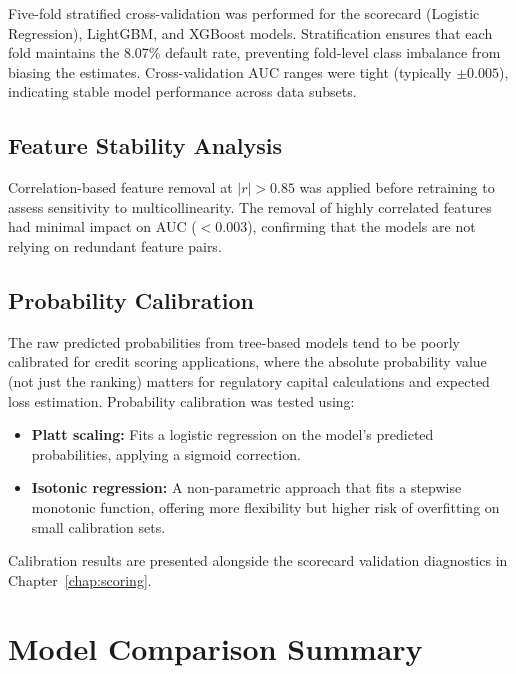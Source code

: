 Five-fold stratified cross-validation was performed for the scorecard (Logistic Regression), LightGBM, and XGBoost models. Stratification ensures that each fold maintains the 8.07\% default rate, preventing fold-level class imbalance from biasing the estimates. Cross-validation AUC ranges were tight (typically $\pm 0.005$), indicating stable model performance across data subsets.

\subsection{Feature Stability Analysis}

Correlation-based feature removal at $|r| > 0.85$ was applied before retraining to assess sensitivity to multicollinearity. The removal of highly correlated features had minimal impact on AUC ($< 0.003$), confirming that the models are not relying on redundant feature pairs.

\subsection{Probability Calibration}

The raw predicted probabilities from tree-based models tend to be poorly calibrated for credit scoring applications, where the absolute probability value (not just the ranking) matters for regulatory capital calculations and expected loss estimation. Probability calibration was tested using:

\begin{itemize}
    \item \textbf{Platt scaling:} Fits a logistic regression on the model's predicted probabilities, applying a sigmoid correction.
    \item \textbf{Isotonic regression:} A non-parametric approach that fits a stepwise monotonic function, offering more flexibility but higher risk of overfitting on small calibration sets.
\end{itemize}

Calibration results are presented alongside the scorecard validation diagnostics in Chapter~\ref{chap:scoring}.

\section{Model Comparison Summary}
\label{sec:model_comparison}

